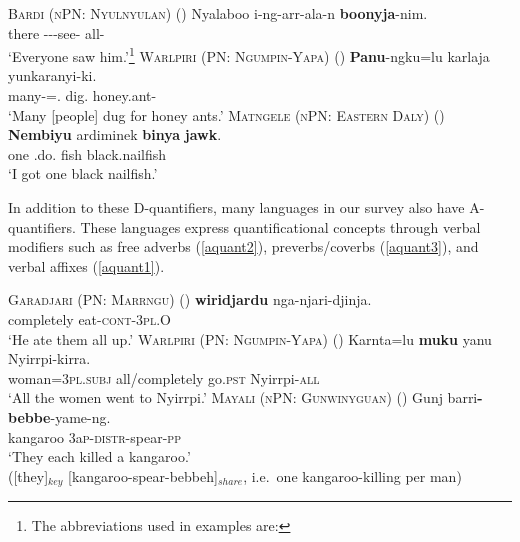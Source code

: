 \documentclass[12pt,egregdoesnotlikesansseriftitles]{scrartcl}
\begin{document}
\begin{exe}
  \ex\label{allerg} \textsc{Bardi (nPN: Nyulnyulan)} \label{agrmarking2} \hfill(\citealt[272]{bowern12})
  \gll Nyalaboo i-ng-arr-ala-n \textbf{boonyja}-nim.\\
  there \Third-\Pst-\Aug-see-\Rempst{} all-\Erg\\
  \glt `Everyone saw him.'\footnote{The abbreviations used in examples are: \printglossary[style=inline,type=\leipzigtype]}
  \ex \textsc{Warlpiri (PN: Ngumpin-Yapa)} \hfill(\citealt[6]{bowler17})
  \gll \textbf{Panu}-ngku=lu karlaja yunkaranyi-ki.\\
  many-\Erg=\Tpl.\Sarg{} dig.\Pst{} honey.ant-\Dat\\
  \glt `Many [people] dug for honey ants.' \label{agrmarking1}
  \ex \textsc{Matngele (nPN: Eastern Daly)} \hfill(\citealt[54]{zandvoort99})
  \gll \textbf{Nembiyu} ardiminek \textbf{binya} \textbf{jawk}.\\
  one \First\Min\Sarg.do.\Pst{} fish black.nailfish\\
  \glt `I got one black nailfish.'  \label{discconst}
\end{exe}


In addition to these D-quantifiers, many languages in our survey also have A-quantifiers. These languages express quantificational concepts through verbal modifiers such as free adverbs (\ref{aquant2}), preverbs/coverbs (\ref{aquant3}), and verbal affixes (\ref{aquant1}).
\begin{exe}
  \ex  \textsc{Garadjari (PN: Marrngu)} \hfill(\citealt[54]{sands89})
  \gll \textbf{wiridjardu}  nga-njari-djinja.\\
  completely  eat-\textsc{cont}-3\textsc{pl.O}\\
  \glt `He ate them all up.' \label{aquant2}
  \ex \textsc{Warlpiri (PN: Ngumpin-Yapa)} \hfill (\citealt[15]{bowler17})
 \gll Karnta=lu \textbf{muku} yanu Nyirrpi-kirra.\\
 woman=3\textsc{pl.subj} all/completely go.\textsc{pst} Nyirrpi\textsc{-all}\\
`All the women went to Nyirrpi.' \label{aquant3}
  \ex \textsc{Mayali (nPN: Gunwinyguan)} \hfill(\citealt[221]{evans95})
  \gll Gunj barri\textbf{-bebbe}-yame-ng.\\
  kangaroo 3a\textsc{p-distr}-spear-\textsc{pp}\\
  \glt `They each killed a kangaroo.'\\
  ([they]$_{key}$ [kangaroo-spear-bebbeh]$_{share}$, i.e.\ one kangaroo-killing per man) \label{aquant1}
\end{exe}
\end{document}
